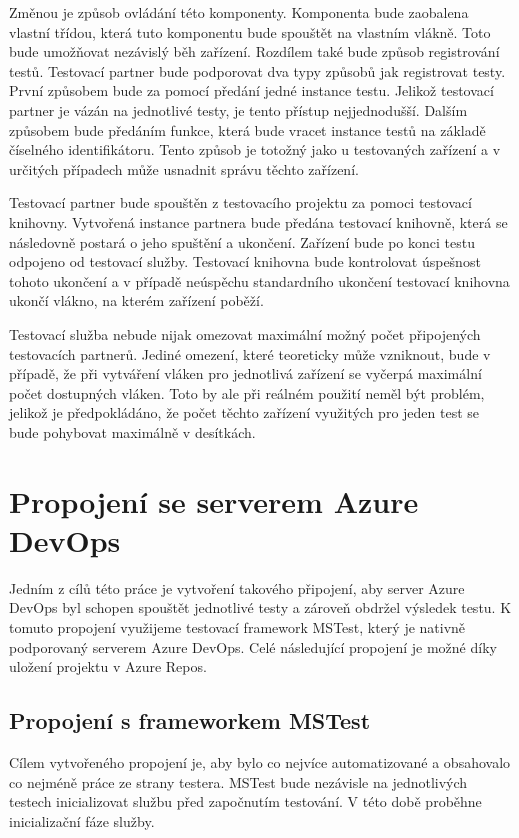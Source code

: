 Změnou je způsob ovládání této komponenty. Komponenta bude zaobalena vlastní třídou, která tuto komponentu bude spouštět na vlastním vlákně. Toto bude umožňovat nezávislý běh zařízení. Rozdílem také bude způsob registrování testů. Testovací partner bude podporovat dva typy způsobů jak registrovat testy. První způsobem bude za pomocí předání jedné instance testu. Jelikož testovací partner je vázán na jednotlivé testy, je tento přístup nejjednodušší. Dalším způsobem bude předáním funkce, která bude vracet instance testů na základě číselného identifikátoru. Tento způsob je totožný jako u testovaných zařízení a v určitých případech může usnadnit správu těchto zařízení. 

Testovací partner bude spouštěn z testovacího projektu za pomoci testovací knihovny. Vytvořená instance partnera bude předána testovací knihovně, která se následovně postará o jeho spuštění a ukončení. Zařízení bude po konci testu odpojeno od testovací služby. Testovací knihovna bude kontrolovat úspešnost tohoto ukončení a v případě neúspěchu standardního ukončení testovací knihovna ukončí vlákno, na kterém zařízení poběží.

Testovací služba nebude nijak omezovat maximální možný počet připojených testovacích partnerů. Jediné omezení, které teoreticky může vzniknout, bude v případě, že při vytváření vláken pro jednotlivá zařízení se vyčerpá maximální počet dostupných vláken. Toto by ale při reálném použití neměl být problém, jelikož je předpokládáno, že počet těchto zařízení využitých pro jeden test se bude pohybovat maximálně v desítkách. 


\section{Propojení se serverem Azure DevOps}

Jedním z cílů této práce je vytvoření takového připojení, aby server Azure DevOps byl schopen spouštět jednotlivé testy a zároveň obdržel výsledek testu. K tomuto propojení využijeme testovací framework MSTest, který je nativně podporovaný serverem Azure DevOps. Celé následující propojení je možné díky uložení projektu v Azure Repos.

\subsection{Propojení s frameworkem MSTest}
Cílem vytvořeného propojení je, aby bylo co nejvíce automatizované a obsahovalo co nejméně práce ze strany testera. MSTest bude nezávisle na jednotlivých testech inicializovat službu před započnutím testování. V této době proběhne inicializační fáze služby. 

